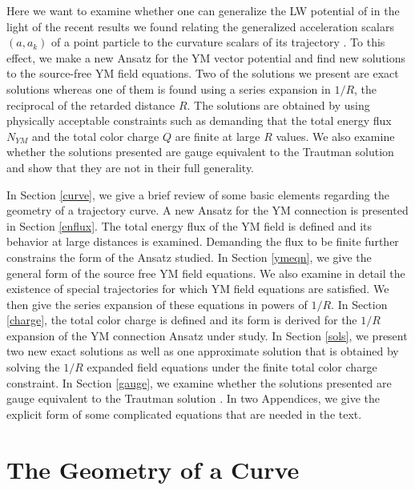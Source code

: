 \documentclass[a4paper,twocolumn,prd,showpacs,amsmath,amssymb]{revtex4}
\begin{document}
Here we want to examine whether one can generalize the LW potential of \cite{traut}
in the light of the recent results we found relating the generalized acceleration
scalars $(a, a_{k})$ of a point particle to the curvature scalars of its trajectory
\cite{gs1}. To this effect, we make a new Ansatz for the YM vector potential
and find new solutions to the source-free YM field equations. Two of the solutions
we present are exact solutions whereas one of them is found using a series expansion
in $1/R$, the reciprocal of the retarded distance $R$. The solutions are obtained by
using physically acceptable constraints such as demanding that the total energy
flux $N_{YM}$ and the total color charge $Q$ are finite at large
$R$ values. We also examine whether the solutions presented are gauge equivalent
to the Trautman solution and show that they are not in their full generality.

In Section \ref{curve}, we give a brief review of some basic elements regarding
the geometry of a trajectory curve. A new Ansatz for the YM connection is
presented in Section \ref{enflux}. The total energy flux of the YM field
is defined and its behavior at large distances is examined. Demanding the
flux to be finite further constrains the form of the Ansatz studied. In Section
\ref{ymeqn}, we give the general form of the source free YM field equations.
We also examine in detail the existence of special trajectories for which
YM field equations are satisfied. We then give the series expansion of these
equations in powers of $1/R$. In Section \ref{charge}, the total color
charge is defined and its form is derived for the $1/R$ expansion of the
YM connection Ansatz under study. In Section \ref{sols}, we present two
new exact solutions as well as one approximate solution that is obtained
by solving the $1/R$ expanded field equations under the finite total
color charge constraint. In Section \ref{gauge}, we examine whether the
solutions presented are gauge equivalent to the Trautman solution \cite{traut}.
In two Appendices, we give the explicit form of some complicated equations
that are needed in the text.

\section{\label{curve} The Geometry of a Curve}
\end{document}
